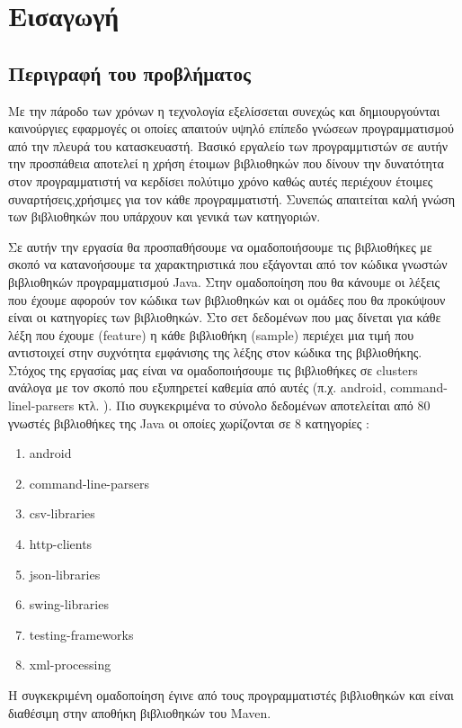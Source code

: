 \chapter{Εισαγωγή}
\section{Περιγραφή του προβλήματος}

Με την πάροδο των χρόνων η τεχνολογία εξελίσσεται συνεχώς και δημιουργούνται καινούργιες εφαρμογές οι οποίες απαιτούν υψηλό επίπεδο γνώσεων προγραμματισμού από την πλευρά του κατασκευαστή. Βασικό εργαλείο των προγραμμτιστών σε αυτήν την προσπάθεια αποτελεί η χρήση έτοιμων βιβλιοθηκών που δίνουν την δυνατότητα στον προγραμματιστή να κερδίσει πολύτιμο χρόνο καθώς αυτές περιέχουν έτοιμες συναρτήσεις,χρήσιμες για τον κάθε προγραμματιστή. Συνεπώς απαιτείται καλή γνώση των βιβλιοθηκών που υπάρχουν και γενικά των κατηγοριών.

Σε αυτήν την εργασία θα προσπαθήσουμε να ομαδοποιήσουμε τις βιβλιοθήκες με σκοπό να κατανοήσουμε τα χαρακτηριστικά που εξάγονται από τον κώδικα γνωστών βιβλιοθηκών προγραμματισμού Java. Στην ομαδοποίηση που θα κάνουμε οι λέξεις που έχουμε αφορούν τον κώδικα των βιβλιοθηκών και οι ομάδες που θα προκύψουν είναι οι κατηγορίες των βιβλιοθηκών. Στο σετ δεδομένων που μας δίνεται για κάθε λέξη που έχουμε (feature) η κάθε βιβλιοθήκη (sample) περιέχει μια τιμή που αντιστοιχεί στην συχνότητα εμφάνισης της λέξης στον κώδικα της βιβλιοθήκης. Στόχος της εργασίας μας είναι να ομαδοποιήσουμε τις βιβλιοθήκες σε clusters ανάλογα με τον σκοπό που εξυπηρετεί καθεμία από αυτές (π.χ. android, command-linel-parsers κτλ. ). Πιο συγκεκριμένα το σύνολο δεδομένων αποτελείται από 80 γνωστές βιβλιοθήκες της Java οι οποίες χωρίζονται σε 8 κατηγορίες :

\begin{enumerate}
	\item  android
	\item  command-line-parsers
	\item  csv-libraries
	\item  http-clients
	\item  json-libraries
	\item  swing-libraries
	\item  testing-frameworks
	\item  xml-processing
\end{enumerate} 

Η συγκεκριμένη ομαδοποίηση έγινε από τους προγραμματιστές βιβλιοθηκών και είναι διαθέσιμη στην αποθήκη βιβλιοθηκών του Maven.

